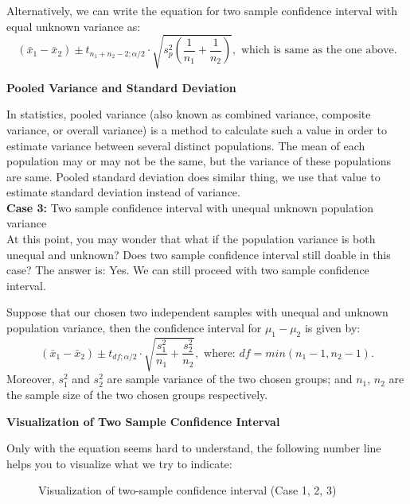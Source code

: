 Alternatively, we can write the equation for two sample confidence interval with equal unknown variance as: $$(\bar{x}_1 - \bar{x}_2)  \pm  t_{n_1+n_2-2; \alpha/2} \cdot \sqrt{s_p^2(\frac{1}{n_1} + \frac{1}{n_2})}, \text{ which is same as the one above.}$$

\textbf{Pooled Variance and Standard Deviation}

In statistics, pooled variance (also known as combined variance, composite variance, or overall variance) is a method to calculate such a value in order to estimate variance between several distinct populations. The mean of each population may or may not be the same, but the variance of these populations are same. Pooled standard deviation does similar thing, we use that value to estimate standard deviation instead of variance.\\

\textbf{Case 3:} Two sample confidence interval with unequal unknown population variance\\

At this point, you may wonder that what if the population variance is both unequal and unknown? Does two sample confidence interval still doable in this case? The answer is: Yes. We can still proceed with two sample confidence interval.

\begin{definition}
Suppose that our chosen two independent samples with unequal and unknown population variance, then the confidence interval for $\mu_1 - \mu_2$ is given by: $$(\bar{x}_1 - \bar{x}_2)  \pm t_{df; \alpha/2} \cdot \sqrt{\frac{s_1^2}{n_1} + \frac{s_2^2}{n_2}}, \text{ where: $df = min(n_1-1, n_2-1)$.}$$
Moreover, $s_1^2$ and $s_2^2$ are sample variance of the two chosen groups; and $n_1$, $n_2$ are the sample size of the two chosen groups respectively.
\end{definition}

\textbf{Visualization of Two Sample Confidence Interval}

Only with the equation seems hard to understand, the following number line helps you to visualize what we try to indicate:

\begin{figure}[h!]
\begin{center}
\end{center}
\caption{Visualization of two-sample confidence interval (Case 1, 2, 3)}
\end{figure}


